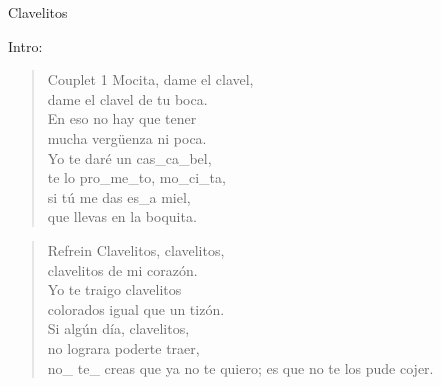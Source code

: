 \begin{song}[vals]{Clavelitos}
\begin{instrumental}{Intro:}
\end{instrumental}

\begin{verse}{Couplet 1}
Mocita, dame el clavel,\\
dame el clavel de tu boca.\\
En eso no hay que tener\\
mucha vergüenza ni poca. \hspace{1em} \hspace{1em} \hspace{1em}\\
Yo te daré un cas\_ca\_bel,\\
\hspace{1em} te lo pro\_me\_to, mo\_ci\_ta, \hspace{1em} \hspace{1em} \hspace{1em}\\
si t\'u me das es\_a miel,\\
que llevas en la boquita.
\end{verse}


\begin{verse}{Refrein}
Clavelitos, clavelitos,\\
clavelitos de mi corazón.\\
Yo te traigo clavelitos\\
colorados igual que un tizón.\\
Si algún día, clavelitos,\\
no lograra poderte traer,\\
no\_ te\_ creas que ya no te quiero;
es que no te los pude cojer. \hspace{1em} \hspace{1em}
\end{verse}


\end{song}
